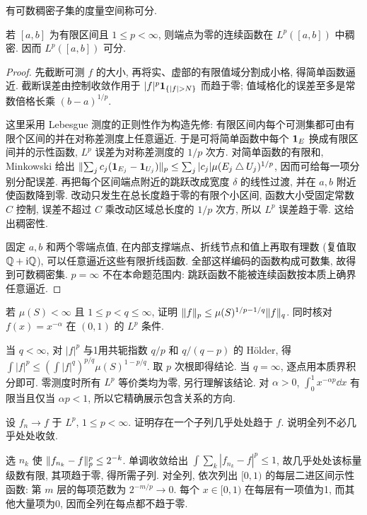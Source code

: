 有可数稠密子集的度量空间称可分.
\begin{proposition}\label{prop:lp-density}
若 $[a,b]$ 为有限区间且 $1\le p<\infty$, 则端点为零的连续函数在 $L^p([a,b])$ 中稠密. 因而 $L^p([a,b])$ 可分.
\end{proposition}
\begin{proof}
先截断可测 $f$ 的大小, 再将实、虚部的有限值域分割成小格, 得简单函数逼近. 截断误差由控制收敛作用于 $|f|^p\ind_{\{|f|>N\}}$ 而趋于零; 值域格化的误差至多是常数倍格长乘 $(b-a)^{1/p}$.

这里采用 Lebesgue 测度的正则性作为构造先修: 有限区间内每个可测集都可由有限个区间的并在对称差测度上任意逼近. 于是可将简单函数中每个 $\mathbf 1_E$ 换成有限区间并的示性函数, $L^p$ 误差为对称差测度的 $1/p$ 次方. 对简单函数的有限和, Minkowski 给出 $\lVert \sum_jc_j(\mathbf 1_{E_j}-\mathbf 1_{U_j})\rVert_p\le\sum_j|c_j|\mu(E_j\mathbin{\triangle}U_j)^{1/p}$, 因而可给每一项分别分配误差. 再把每个区间端点附近的跳跃改成宽度 $\delta$ 的线性过渡, 并在 $a,b$ 附近使函数降到零. 改动只发生在总长度趋于零的有限个小区间, 函数大小受固定常数 $C$ 控制, 误差不超过 $C$ 乘改动区域总长度的 $1/p$ 次方, 所以 $L^p$ 误差趋于零. 这给出稠密性.

固定 $a,b$ 和两个零端点值, 在内部支撑端点、折线节点和值上再取有理数 (复值取 $\mathbb Q+\mathrm i\mathbb Q$), 可以任意逼近这些有限折线函数. 全部这样编码的函数构成可数集, 故得到可数稠密集. $p=\infty$ 不在本命题范围内: 跳跃函数不能被连续函数按本质上确界任意逼近.
\end{proof}

\begin{exercise}\label{legacy:ch05:exercise1}
若 $\mu(S)<\infty$ 且 $1\le p<q\le\infty$, 证明 $\lVert f\rVert_p\le\mu(S)^{1/p-1/q}\lVert f\rVert_q$. 同时核对 $f(x)=x^{-\alpha}$ 在 $(0,1)$ 的 $L^p$ 条件.
\end{exercise}
\begin{solution}
当 $q<\infty$, 对 $|f|^p$ 与1用共轭指数 $q/p$ 和 $q/(q-p)$ 的 Hölder, 得 $\int|f|^p\le(\int|f|^q)^{p/q}\mu(S)^{1-p/q}$. 取 $p$ 次根即得结论. 当 $q=\infty$, 逐点用本质界积分即可. 零测度时所有 $L^p$ 等价类均为零, 另行理解该结论. 对 $\alpha>0$, $\int_0^1x^{-\alpha p}\dd x$ 有限当且仅当 $\alpha p<1$, 所以它精确展示包含关系的方向.
\end{solution}

\begin{exercise}\label{legacy:ch05:exercise2}
设 $f_n\to f$ 于 $L^p$, $1\le p<\infty$. 证明存在一个子列几乎处处趋于 $f$. 说明全列不必几乎处处收敛.
\end{exercise}
\begin{solution}
选 $n_k$ 使 $\lVert f_{n_k}-f\rVert_p^p\le2^{-k}$. 单调收敛给出 $\int\sum_k|f_{n_k}-f|^p\le1$, 故几乎处处该标量级数有限, 其项趋于零, 得所需子列. 对全列, 依次列出 $[0,1)$ 的每层二进区间示性函数: 第 $m$ 层的每项范数为 $2^{-m/p}\to0$. 每个 $x\in[0,1)$ 在每层有一项值为1, 而其他大量项为0, 因而全列在每点都不趋于零.
\end{solution}
